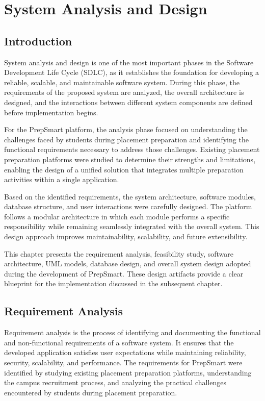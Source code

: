 \chapter{System Analysis and Design}

\section{Introduction}

System analysis and design is one of the most important phases in the Software Development Life Cycle (SDLC), as it establishes the foundation for developing a reliable, scalable, and maintainable software system. During this phase, the requirements of the proposed system are analyzed, the overall architecture is designed, and the interactions between different system components are defined before implementation begins.

For the PrepSmart platform, the analysis phase focused on understanding the challenges faced by students during placement preparation and identifying the functional requirements necessary to address those challenges. Existing placement preparation platforms were studied to determine their strengths and limitations, enabling the design of a unified solution that integrates multiple preparation activities within a single application.

Based on the identified requirements, the system architecture, software modules, database structure, and user interactions were carefully designed. The platform follows a modular architecture in which each module performs a specific responsibility while remaining seamlessly integrated with the overall system. This design approach improves maintainability, scalability, and future extensibility.

This chapter presents the requirement analysis, feasibility study, software architecture, UML models, database design, and overall system design adopted during the development of PrepSmart. These design artifacts provide a clear blueprint for the implementation discussed in the subsequent chapter.

\section{Requirement Analysis}

Requirement analysis is the process of identifying and documenting the functional and non-functional requirements of a software system. It ensures that the developed application satisfies user expectations while maintaining reliability, security, scalability, and performance. The requirements for PrepSmart were identified by studying existing placement preparation platforms, understanding the campus recruitment process, and analyzing the practical challenges encountered by students during placement preparation.


